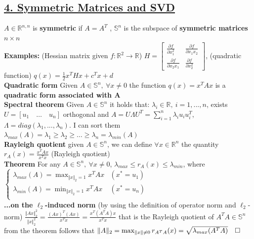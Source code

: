 \documentclass[a4paper]{article}
\begin{document}
\subsection*{\underline{4. Symmetric Matrices and SVD}}
$A\in\mathbb{R}^{n,n}$ is \textbf{symmetric} if $A=A^T$ , $\mathbb{S}^n$ is the subspace of \textbf{symmetric matrices} $n\times{n}$ \\
\textbf{Examples:} (Hessian matrix given $f:\mathbb{R}^2\to\mathbb{R}$) $H=\begin{bmatrix}
    \frac{\partial{f}}{\partial{x_1^2}}&\frac{\partial{f}}{\partial{x_1{x_2}}}\\
    \frac{\partial{f}}{\partial{x_2{x_1}}}&\frac{\partial{f}}{\partial{x_2^2}}
\end{bmatrix}$, (quadratic function) $q(x)=\frac{1}{2}x^T{H}x+c^T{x}+d$\\
\textbf{Quadratic form} Given $A\in\mathbb{S}^n, \ \forall x \ne 0$ the function $q(x)=x^T A x$ is a \textbf{quadratic form associated with A}\\
\textbf{Spectral theorem} Given $A\in\mathbb{S}^n$ it holds that: $\lambda_i\in\mathbb{R}, \ i=1,...,n$, exists $U=[u_1\quad\dots\quad{u_n}]$ orthogonal and $A=U\Lambda{U^T}=\sum_{i=1}^{n}{\lambda_i{u_i}u_i^T}$, $\Lambda=diag(\lambda_1, ..., \lambda_n)$. I can sort them $\lambda_{max}(A)=\lambda_1 \ge \lambda_2 \ge \dots \ge \lambda_n=\lambda_{min}(A)$\\
\textbf{Rayleigh quotient} given $A\in\mathbb{S}^n$, we can define $\forall x \in \mathbb{R}^n$ the quantity $r_{A}(x)=\frac{x^T{A}x}{x^T{x}}$ (Rayleigh quotient)\\
\textbf{Theorem} For any $A\in\mathbb{S}^n, \ \forall x \ne 0$, $\lambda_{max} \le r_{A}(x) \le \lambda_{min}$, where 
$\begin{cases}
    \lambda_{max}(A)=\max_{\Vert x \Vert_2=1} {x^T A x}&(x^*=u_1)\\
    \lambda_{min}(A)=\min_{\Vert x \Vert_2=1} {x^T A x}&(x^*=u_n)\\
\end{cases}$\\
\textbf{...on the $\ell_2$-induced norm} (by using the definition of operator norm and $\ell_2$-norm) $\frac{\Vert Ax \Vert_2^2}{\Vert x \Vert_2^2}=\frac{(Ax)^T{(Ax)}}{x^T{x}} = \frac{x^T{(A^T{A})x}}{x^T{x}}$ that is the Rayleigh quotient of $A^T{A}\in\mathbb{S}^n$ from the theorem follows that $\Vert A \Vert_2 = \max_{\Vert x \Vert \ne 0} r_{\small A^T A}(x)=\sqrt{\lambda_{max}(A^T A)} \quad \square$ \\
\end{document}
